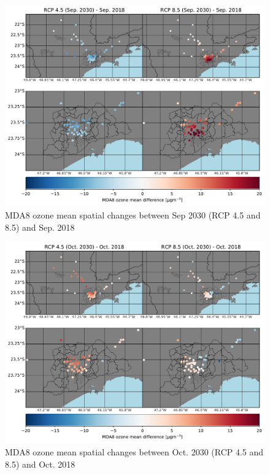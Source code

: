 
\begin{figure}[hbt]
\begin{center}
	\includegraphics[width=1\textwidth]{fig/MDA8_spatial_station}
\end{center}
  \caption{MDA8 ozone mean spatial changes between Sep 2030 (RCP 4.5 and 8.5) and Sep. 2018}
  \label{fig:spatial_o3_sep}
\end{figure}

\begin{figure}[hbt]
  \includegraphics[width=1\textwidth]{fig/MDA8_spatial_station_oct}
  \caption{MDA8 ozone mean spatial changes between Oct. 2030 (RCP 4.5 and 8.5) and Oct. 2018}
  \label{fig:spatial_o3_oct}
\end{figure}



   

